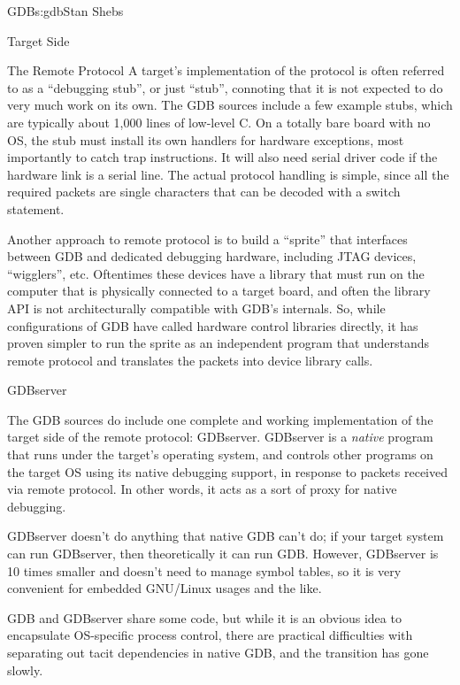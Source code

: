\begin{aosachapter}{GDB}{s:gdb}{Stan Shebs}
\begin{aosasect1}{Target Side}
\begin{aosasect2}{The Remote Protocol}
A target's implementation of the protocol is often referred to as a
``debugging stub'', or just ``stub'', connoting that it is not expected
to do very much work on its own.  The GDB sources include a few
example stubs, which are typically about 1,000 lines of low-level C.
On a totally bare board with no OS, the stub must install its own
handlers for hardware exceptions, most importantly to catch trap
instructions.  It will also need serial driver code if the hardware
link is a serial line.  The actual protocol handling is simple, since
all the required packets are single characters that can be decoded
with a switch statement.

Another approach to remote protocol is to build a ``sprite'' that
interfaces between GDB and dedicated debugging hardware, including
JTAG devices, ``wigglers'', etc.  Oftentimes these devices
have a library that must run on the computer that is physically
connected to a target board, and often the library API is not
architecturally compatible with GDB's internals.  So, while configurations of
GDB have called hardware control libraries directly, it has proven simpler to run
the sprite as an independent program that understands remote protocol
and translates the packets into device library calls.

\end{aosasect2}

\begin{aosasect2}{GDBserver}

The GDB sources do include one complete and working implementation of
the target side of the remote protocol: GDBserver.  GDBserver is a
{\em native} program that runs under the target's operating system,
and controls other programs on the target OS using its native
debugging support, in response to packets received via remote protocol.
In other words, it acts as a sort of proxy for native debugging.

GDBserver doesn't do anything that native GDB can't do; if your target
system can run GDBserver, then theoretically it can run GDB.  However,
GDBserver is 10 times smaller and doesn't need to manage symbol
tables, so it is very convenient for embedded GNU/Linux usages and the
like.


GDB and GDBserver share some code, but while it is an obvious idea to
encapsulate OS-specific process control, there are practical difficulties
with separating out tacit dependencies in native GDB, and the transition
has gone slowly.


\end{aosasect2}
\end{aosasect1}
\end{aosachapter}
